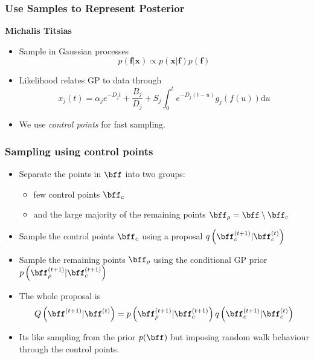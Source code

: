 \begin{frame}
  \frametitle{Use Samples to Represent Posterior}

  \begin{flushright}
    \textbf{Michalis Titsias}
    \par\end{flushright}
  \begin{itemize}
  \item Sample in Gaussian processes\[
    p\left(\mathbf{f}|\mathbf{x}\right)\propto p\left(\mathbf{x}|\mathbf{f}\right)p\left(\mathbf{f}\right)\]

  \item Likelihood relates GP to data through\[
    x_{j}\left(t\right)=\alpha_{j}e^{-D_{j}t}+\frac{B_{j}}{D_{j}}+S_{j}\int_{0}^{t}e^{-D_{j}\left(t-u\right)}g_{j}(f\left(u\right))\text{d}u\]

  \item We use \emph{control points }for fast sampling. {\small \citep{Titsias:efficient08}}
  \end{itemize}

\end{frame}

\begin{frame}
  \frametitle{Sampling using control points}
  \begin{itemize}
  \item Separate the points in $\bff$ into two groups:

    \begin{itemize}
    \item few control points $\bff_{c}$ 
    \item and the large majority of the remaining points $\bff_{\rho}=\bff\setminus\bff_{c}$
    \end{itemize}
  \item Sample the control points $\bff_{c}$ using a proposal $q\left(\bff_{c}^{(t+1)}|\bff_{c}^{(t)}\right)$
  \item Sample the remaining points $\bff_{\rho}$ using the conditional GP
    prior $p\left(\bff_{\rho}^{(t+1)}|\bff_{c}^{(t+1)}\right)$
  \item The whole proposal is \[
    Q\left(\bff^{(t+1)}|\bff^{(t)}\right)=p\left(\bff_{\rho}^{(t+1)}|\bff_{c}^{(t+1)}\right)q\left(\bff_{c}^{(t+1)}|\bff_{c}^{(t)}\right)\]

  \item Its like sampling from the prior $p(\bff)$ but imposing random walk
    behaviour through the control points. 
  \end{itemize}
  \begin{center}

    \par\end{center}


\end{frame}

